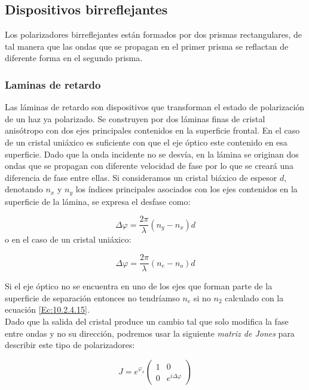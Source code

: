 \documentclass[12pt]{article}
\numberwithin{equation}{section}
\numberwithin{figure}{section}
\begin{document}
\subsection{Dispositivos birreflejantes}

Los polarizadores birreflejantes están formados por dos prismas rectangulares, de tal manera que las ondas que se propagan en el primer prisma se reflactan de diferente forma en el segundo prisma.

\subsubsection{Laminas de retardo}

Las láminas de retardo son dispositivos que transforman el estado de polarización de un haz ya polarizado. Se construyen por dos láminas finas de cristal anisótropo con dos ejes principales contenidos en la superficie frontal. En el caso de un cristal uniáxico es suficiente con que el eje óptico este contenido en esa superficie. Dado que la onda incidente no se desvía, en la lámina se originan dos ondas que se propagan con diferente velocidad de fase por lo que se creará una diferencia de fase entre ellas. Si consideramos un cristal biáxico de espesor $d$, denotando $n_x$ y $n_y$ los índices principales asociados con los ejes contenidos en la superficie de la lámina, se expresa el desfase como:

\begin{equation}
\Delta \varphi = \frac{2 \pi}{\lambda} (n_y - n_x) d
\end{equation}
o en el caso de un cristal uniáxico:

\begin{equation}
\Delta \varphi = \dfrac{2 \pi}{\lambda} (n_e - n_o ) d 
\end{equation}

Si el eje óptico no se encuentra en uno de los ejes que forman parte de la superficie de separación entonces no tendríamso $n_e$ si no $n_2$ calculado con la ecuación \ref{Ec:10.2.4.15}. \\

Dado que la salida del cristal produce un cambio tal que solo modifica la fase entre ondas y no su dirección, podremos usar la siguiente \textit{matriz de Jones} para describir este tipo de polarizadores:

\begin{equation}
J = e^{\varphi_x} 
\begin{pmatrix}
1 & 0 \\
0 & e^{i \Delta \varphi}
\end{pmatrix}
\end{equation}
\end{document}
